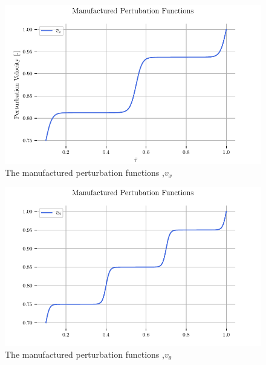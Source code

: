 \begin{figure}[h!]
    \centering
    \includegraphics{../../../CodeRun/04-plotReport/tex-outputs/MMS1_perturbation_variables_vX.pdf}
\caption{The manufactured perturbation functions ,$v_x$}%
    \label{fig:2a}
\end{figure}


\begin{figure}[h!]
    \centering
    \includegraphics{../../../CodeRun/04-plotReport/tex-outputs/MMS1_perturbation_variables_vTh.pdf}
    \caption{The manufactured perturbation functions ,$v_{\theta}$}%
    \label{fig:3a}
\end{figure}


